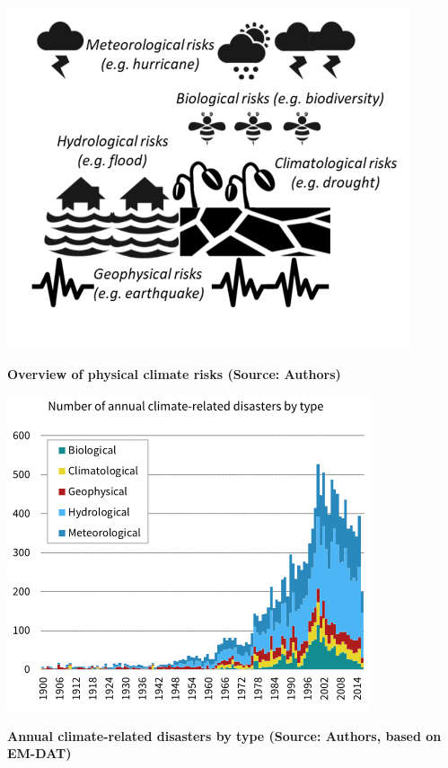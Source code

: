 \documentclass[10pt,table,a4]{article}\usepackage[]{graphicx}\usepackage[]{color}
\begin{document}
	\begin{multicols}{2}
		\includegraphics[width=1\linewidth]{ReportGraphics/PhysicalClimateRisks.png}
		
		\textbf{\small Overview of physical climate risks (Source: Authors)}
		
		\includegraphics[width=1\linewidth]{ReportGraphics/ClimateDisasters.png}
		
		\textbf{\small Annual climate-related disasters by type (Source: Authors, based on EM-DAT)}
	\end{multicols}
	
\end{document}
